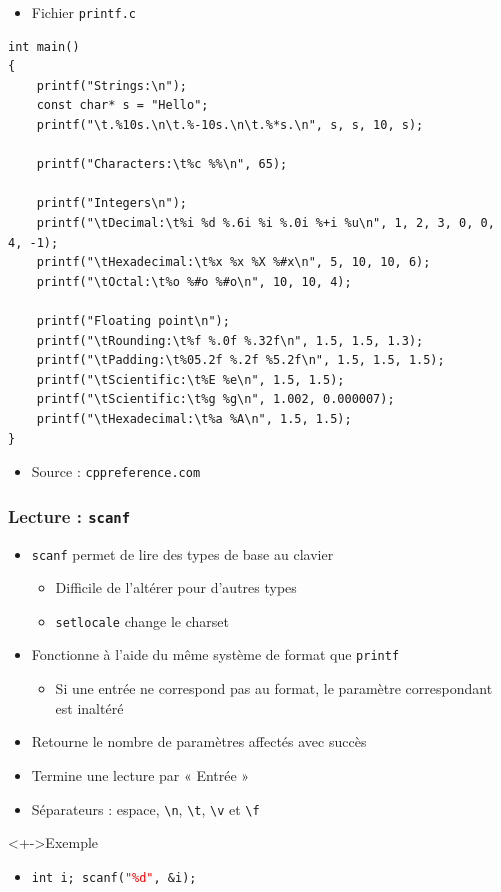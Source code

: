 \begin{frame}[containsverbatim]
\begin{itemize}
\item Fichier \texttt{printf.c}
\end{itemize}
\begin{lstlisting}
int main()
{
    printf("Strings:\n");
    const char* s = "Hello";
    printf("\t.%10s.\n\t.%-10s.\n\t.%*s.\n", s, s, 10, s);
 
    printf("Characters:\t%c %%\n", 65);
 
    printf("Integers\n");
    printf("\tDecimal:\t%i %d %.6i %i %.0i %+i %u\n", 1, 2, 3, 0, 0, 4, -1);
    printf("\tHexadecimal:\t%x %x %X %#x\n", 5, 10, 10, 6);
    printf("\tOctal:\t%o %#o %#o\n", 10, 10, 4);
 
    printf("Floating point\n");
    printf("\tRounding:\t%f %.0f %.32f\n", 1.5, 1.5, 1.3);
    printf("\tPadding:\t%05.2f %.2f %5.2f\n", 1.5, 1.5, 1.5);
    printf("\tScientific:\t%E %e\n", 1.5, 1.5);
    printf("\tScientific:\t%g %g\n", 1.002, 0.000007);
    printf("\tHexadecimal:\t%a %A\n", 1.5, 1.5);
}
\end{lstlisting}
\begin{itemize}
\item Source : \texttt{cppreference.com}
\end{itemize}
\end{frame}

\begin{frame}
\frametitle{Lecture : \texttt{scanf}}
\begin{itemize}[<+->]
\item \texttt{scanf} permet de lire des types de base au clavier
	\begin{itemize}
	\item Difficile de l'altérer pour d'autres types
	\item \texttt{setlocale} change le charset	
	\end{itemize}
\item Fonctionne à l'aide du même système de format que \texttt{printf}
	\begin{itemize}
	\item Si une entrée ne correspond pas au format, le paramètre correspondant est inaltéré	
	\end{itemize}
\item Retourne le nombre de paramètres affectés avec succès
\item Termine une lecture par « Entrée »
\item Séparateurs : espace, \texttt{\textbackslash{}n}, \texttt{\textbackslash{}t}, \texttt{\textbackslash{}v} et \texttt{\textbackslash{}f}
\end{itemize}
\begin{exampleblock}<+->{Exemple}
	\begin{itemize}[<+->]
	\item \texttt{\textcolor{blue!60}{int} i; scanf(\textcolor{red}{"\%d"}, \&i);} %
	\end{itemize}
\end{exampleblock}
\end{frame}

